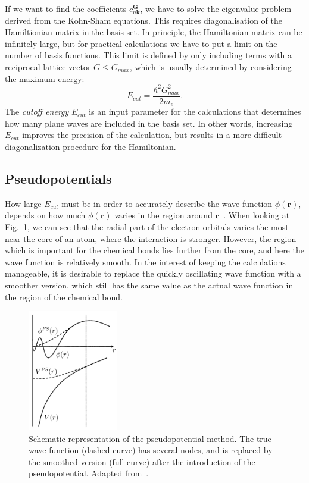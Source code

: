 \begin{refsection}
If we want to find the coefficients $c_{n\mathbf{k}}^{\mathbf{G}}$, we have to solve the eigenvalue problem derived from the Kohn-Sham equations. This requires diagonalisation of the Hamiltionian matrix in the basis set. In principle, the Hamiltonian matrix can be infinitely large, but for practical calculations we have to put a limit on the number of basis functions. This limit is defined by only including terms with a reciprocal lattice vector $G \leq G_{max}$, which is usually determined by considering the maximum energy:
\begin{equation}
E_{cut} = \frac{\hbar^2 G_{max}^2}{2m_e}.
\end{equation}
The \textit{cutoff energy} $E_{cut}$ is an input parameter for the calculations that determines how many plane waves are included in the basis set. In other words, increasing $E_{cut}$ improves the precision of the calculation, but results in a more difficult diagonalization procedure for the Hamiltonian. 

\subsection{Pseudopotentials}

How large $E_{cut}$ must be in order to accurately describe the wave function $\phi (\mathbf{r})$, depends on how much $\phi (\mathbf{r})$ varies in the region around $\mathbf{r}$~\cite{Kohanoff2006}. When looking at Fig.~\ref{fig:pseudo}, we can see that the radial part of the electron orbitals varies the most near the core of an atom, where the interaction is stronger. However, the region which is important for the chemical bonds lies further from the core, and here the wave function is relatively smooth. In the interest of keeping the calculations manageable, it is desirable to replace the quickly oscillating wave function with a smoother version, which still has the same value as the actual wave function in the region of the chemical bond.

\begin{figure}[!h] 
\captionsetup{width=0.8\textwidth}
\centering
\includegraphics[width=0.35\textwidth]{Figures/DFT/pseudopot.png}
\caption{\label{fig:pseudo} Schematic representation of the pseudopotential method. The true wave function (dashed curve) has several nodes, and is replaced by the smoothed version (full curve) after the introduction of the pseudopotential. Adapted from~\cite{Singh2006}.}
\end{figure}


\end{refsection}
